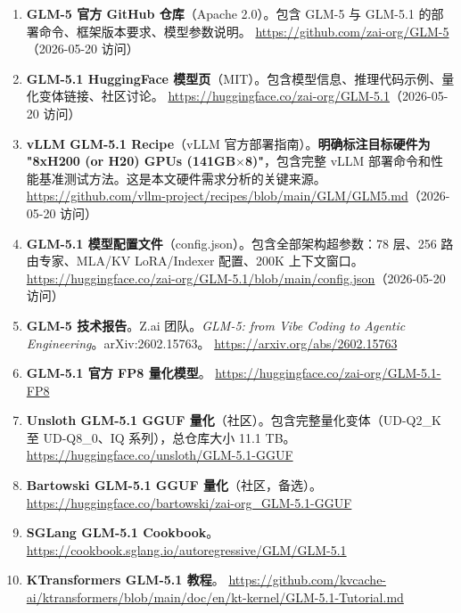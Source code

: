 \documentclass[UTF8,a4paper,10pt,oneside]{ctexart}
\begin{document}
\begin{enumerate}
    \item \textbf{GLM-5 官方 GitHub 仓库}（Apache 2.0）。包含 GLM-5 与 GLM-5.1 的部署命令、框架版本要求、模型参数说明。\newline
    \url{https://github.com/zai-org/GLM-5}（2026-05-20 访问）

    \item \textbf{GLM-5.1 HuggingFace 模型页}（MIT）。包含模型信息、推理代码示例、量化变体链接、社区讨论。\newline
    \url{https://huggingface.co/zai-org/GLM-5.1}（2026-05-20 访问）

    \item \textbf{vLLM GLM-5.1 Recipe}（vLLM 官方部署指南）。\textbf{明确标注目标硬件为 "8xH200 (or H20) GPUs (141GB$\times$8)"}，包含完整 vLLM 部署命令和性能基准测试方法。这是本文硬件需求分析的关键来源。\newline
    \url{https://github.com/vllm-project/recipes/blob/main/GLM/GLM5.md}（2026-05-20 访问）

    \item \textbf{GLM-5.1 模型配置文件}（config.json）。包含全部架构超参数：78 层、256 路由专家、MLA/KV LoRA/Indexer 配置、200K 上下文窗口。\newline
    \url{https://huggingface.co/zai-org/GLM-5.1/blob/main/config.json}（2026-05-20 访问）

    \item \textbf{GLM-5 技术报告}。Z.ai 团队。\textit{GLM-5: from Vibe Coding to Agentic Engineering}。arXiv:2602.15763。\newline
    \url{https://arxiv.org/abs/2602.15763}

    \item \textbf{GLM-5.1 官方 FP8 量化模型}。\newline
    \url{https://huggingface.co/zai-org/GLM-5.1-FP8}

    \item \textbf{Unsloth GLM-5.1 GGUF 量化}（社区）。包含完整量化变体（UD-Q2\_K 至 UD-Q8\_0、IQ 系列），总仓库大小 11.1 TB。\newline
    \url{https://huggingface.co/unsloth/GLM-5.1-GGUF}

    \item \textbf{Bartowski GLM-5.1 GGUF 量化}（社区，备选）。\newline
    \url{https://huggingface.co/bartowski/zai-org_GLM-5.1-GGUF}

    \item \textbf{SGLang GLM-5.1 Cookbook}。\newline
    \url{https://cookbook.sglang.io/autoregressive/GLM/GLM-5.1}

    \item \textbf{KTransformers GLM-5.1 教程}。\newline
    \url{https://github.com/kvcache-ai/ktransformers/blob/main/doc/en/kt-kernel/GLM-5.1-Tutorial.md}
\end{enumerate}
\end{document}
